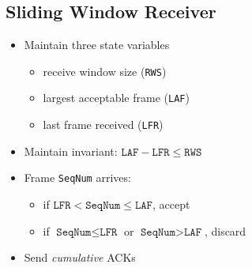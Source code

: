 \subsection{Sliding Window Receiver}
\begin{itemize}
    \item Maintain three state variables
          \begin{itemize}[nosep]
              \item receive window size (\texttt{RWS})
              \item largest acceptable frame (\texttt{LAF})
              \item last frame received (\texttt{LFR})
          \end{itemize}
    \item Maintain invariant: $\texttt{LAF} - \texttt{LFR} \leq \texttt{RWS}$
    \item Frame \texttt{SeqNum} arrives:
          \begin{itemize}[nosep]
              \item if $\texttt{LFR} < \texttt{SeqNum} \leq \texttt{LAF}$, accept
              \item if $\texttt{SeqNum} \leq \texttt{LFR}$ or $\texttt{SeqNum} > \texttt{LAF}$, discard
          \end{itemize}
    \item Send \emph{cumulative} ACKs
\end{itemize}